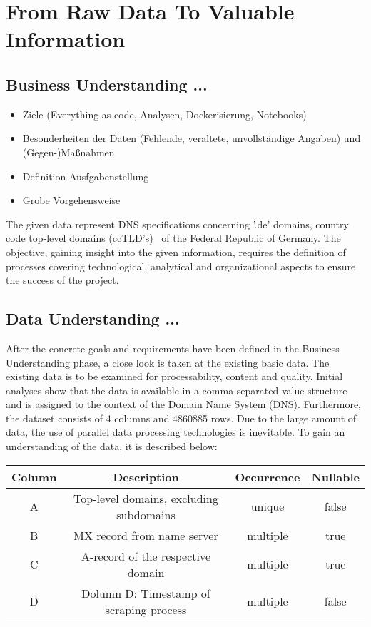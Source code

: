 \section{From Raw Data To Valuable Information}\label{sec:from-raw-data-to-valuable-information}

\subsection{Business Understanding ...}\label{subsec:businessunderstanding}
\begin{itemize}
    \item Ziele (Everything as code, Analysen, Dockerisierung, Notebooks)
    \item Besonderheiten der Daten (Fehlende, veraltete, unvollständige Angaben) und (Gegen-)Maßnahmen
    \item Definition Ausfgabenstellung
    \item Grobe Vorgehensweise
\end{itemize}

The given data represent DNS specifications concerning '.de' domains, country code top-level domains (ccTLD's)~\autocite[cf.][]{DENICeG.2021} of the Federal Republic of Germany.
The objective, gaining insight into the given information, requires the definition of processes covering technological, analytical and organizational aspects to ensure the success of the project.


\subsection{Data Understanding ...}\label{subsec:dataunderstanding}
After the concrete goals and requirements have been defined in the Business Understanding phase, a close look is taken at the existing basic data.
The existing data is to be examined for processability, content and quality.
Initial analyses show that the data is available in a comma-separated value structure and is assigned to the context of the Domain Name System (DNS).
Furthermore, the dataset consists of 4 columns and 4860885 rows.
Due to the large amount of data, the use of parallel data processing technologies is inevitable.
To gain an understanding of the data, it is described below:

\begin{center}
    \begin{tabular}{||c c c c||} 
    \hline
    Column & Description & Occurrence & Nullable \\ [0.5ex] 
    \hline\hline
    A & Top-level domains, excluding subdomains & unique & false \\ 
    \hline
    B & MX record from name server & multiple & true \\
    \hline
    C & A-record of the respective domain & multiple & true \\
    \hline
    D & Dolumn D: Timestamp of scraping process & multiple & false
   \end{tabular}
   \end{center}

